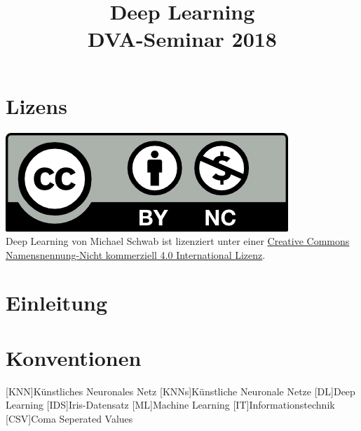 \documentclass[conference, german]{IEEEtran}
\begin{document}
\title{Deep Learning\\
{\footnotesize DVA-Seminar 2018}
}
\author{
}

\maketitle
\renewcommand{\abstractname}{Zusammenfassung}



\begin{abstract}
\end{abstract}

\section*{Lizens}
\href{http://creativecommons.org/licenses/by-nc/4.0/}{\includegraphics{img/by-nc.png}}\\
{Deep Learning} von {Michael Schwab} ist lizenziert unter einer
\href{http://creativecommons.org/licenses/by-nc/4.0/}{Creative Commons
	Namensnennung-Nicht kommerziell 4.0 International Lizenz}.
\section{Einleitung} 
\section{Konventionen}
\begin{acronym}
	[KNN]{Künstliches Neuronales Netz}
	[KNNs]{Künstliche Neuronale Netze}
	[DL]{Deep Learning}
	[IDS]{Iris-Datensatz}
	[ML]{Machine Learning}
	[IT]{Informationstechnik}
	[CSV]{Coma Seperated Values}
\end{acronym}
\end{document}
